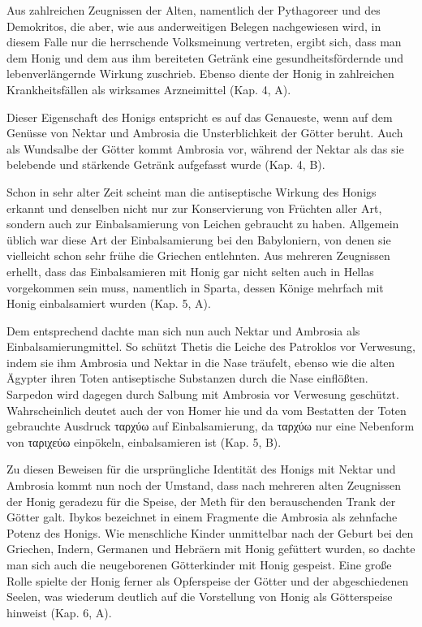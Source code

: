 \documentclass[a4paper, 11pt, oneside]{article}
\begin{document}
Aus zahlreichen Zeugnissen der Alten, namentlich der Pythagoreer und des Demokritos, die aber, wie aus anderweitigen Belegen nachgewiesen wird, in diesem Falle nur die herrschende Volksmeinung vertreten, ergibt sich, dass man dem Honig und dem aus ihm bereiteten Getränk eine gesundheitsfördernde und lebenverlängernde Wirkung zuschrieb. Ebenso diente der Honig in zahlreichen Krankheitsfällen als wirksames Arzneimittel (Kap. 4, A).

Dieser Eigenschaft des Honigs entspricht es auf das Genaueste, wenn auf dem Genüsse von Nektar und Ambrosia die Unsterblichkeit der Götter beruht. Auch als Wundsalbe der Götter kommt Ambrosia vor, während der Nektar als das sie belebende und stärkende Getränk aufgefasst wurde (Kap. 4, B).

Schon in sehr alter Zeit scheint man die antiseptische Wirkung des Honigs erkannt und denselben nicht nur zur Konservierung von Früchten aller Art, sondern auch zur Einbalsamierung von Leichen gebraucht zu haben. Allgemein üblich war diese Art der Einbalsamierung bei den Babyloniern, von denen sie vielleicht schon sehr frühe die Griechen entlehnten. Aus mehreren Zeugnissen erhellt, dass das Einbalsamieren mit Honig gar nicht selten auch in Hellas vorgekommen sein muss, namentlich in Sparta, dessen Könige mehrfach mit Honig einbalsamiert wurden (Kap. 5, A).

Dem entsprechend dachte man sich nun auch Nektar und Ambrosia als Einbalsamierungmittel. So schützt Thetis die Leiche des Patroklos vor Verwesung, indem sie ihm Ambrosia und Nektar in die Nase träufelt, ebenso wie die alten Ägypter ihren Toten antiseptische Substanzen durch die Nase einflößten. Sarpedon wird dagegen durch Salbung mit Ambrosia vor Verwesung geschützt. Wahrscheinlich deutet auch der von Homer hie und da vom Bestatten der Toten gebrauchte Ausdruck ταρχύω auf Einbalsamierung, da ταρχύω nur eine Nebenform von ταριχεύω einpökeln, einbalsamieren ist (Kap. 5, B).

Zu diesen Beweisen für die ursprüngliche Identität des Honigs mit Nektar und Ambrosia kommt nun noch der Umstand, dass nach mehreren alten Zeugnissen der Honig geradezu für die Speise, der Meth für den berauschenden Trank der Götter galt. Ibykos bezeichnet in einem Fragmente die Ambrosia als zehnfache Potenz des Honigs. Wie menschliche Kinder unmittelbar nach der Geburt bei den Griechen, Indern, Germanen und Hebräern mit Honig gefüttert wurden, so dachte man sich auch die neugeborenen Götterkinder mit Honig gespeist. Eine große Rolle spielte der Honig ferner als Opferspeise der Götter und der abgeschiedenen Seelen, was wiederum deutlich auf die Vorstellung von Honig als Götterspeise hinweist (Kap. 6, A).
\end{document}

